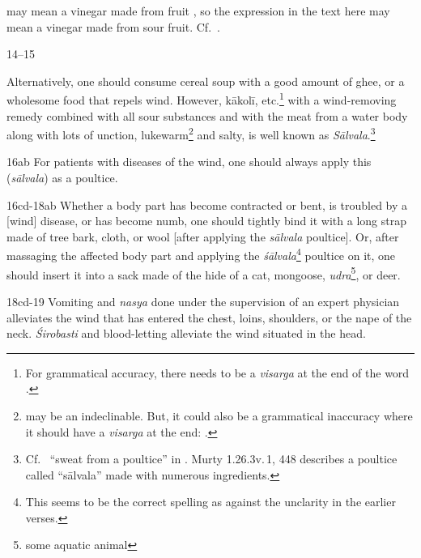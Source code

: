 \begin{translation}
{   may mean a vinegar made from fruit  
\citep[70]{moni-sans}, so the expression  in the
text here may mean a vinegar made from sour fruit. Cf.\
.}
    
     \bigskip       
    \begin{tt}
        
    \item[14--15]
    
  
    
    Alternatively, one should consume cereal soup with a good amount
of ghee, or a wholesome food that repels wind. However,
\gls{kākolī}, etc.\footnote{For grammatical accuracy, there needs
    to be a \emph{visarga} at the end of the word \dev{kākolyādi}.}
    with a wind-removing remedy combined with all sour substances and
    with the meat from a water body along with lots of unction,
    lukewarm\footnote{ may be an indeclinable. But,
        it could also be a grammatical inaccuracy where it should have a
        \textit{visarga} at the end: \dev{sukhoṣṇaḥ}.} and salty, is well
        known as \textit{Sālvala}.\footnote{Cf.\ \dev{sālvaṇa} “sweat from
            a poultice” in \cite[898]{josi-maha}.              
            Murty {1.26.3}{v.\,1, 448} describes a poultice called “sālvala” made 
            with numerous ingredients.}\q{fix As ref.}

    \item[16ab]
    For patients with diseases of the wind, one should always apply this 
    (\textit{sālvala}) as a poultice.
    
    
   
    \item[16cd-18ab]
     Whether a body part has become contracted or bent, is troubled by a 
     [wind] disease, or has become numb, one should tightly bind it with a long 
     strap made of tree bark, cloth, or wool [after applying the \textit{sālvala} 
     poultice]. Or, after massaging the affected body part and applying the 
     \textit{śālvala}\footnote{This seems to be the correct spelling as against 
     the unclarity in the earlier verses.} poultice on it, one should insert it into a 
     sack made of the hide of a cat, mongoose, \textit{udra}\footnote{some 
     aquatic animal}, or deer.

    \item[18cd-19]
    Vomiting and \textit{nasya} done under the supervision of an expert 
    physician alleviates the wind that has entered the chest, loins, shoulders, or 
    the nape of the neck. \textit{Śirobasti} and blood-letting alleviate the wind 
    situated in the head. 


\end{tt}
\end{translation}
